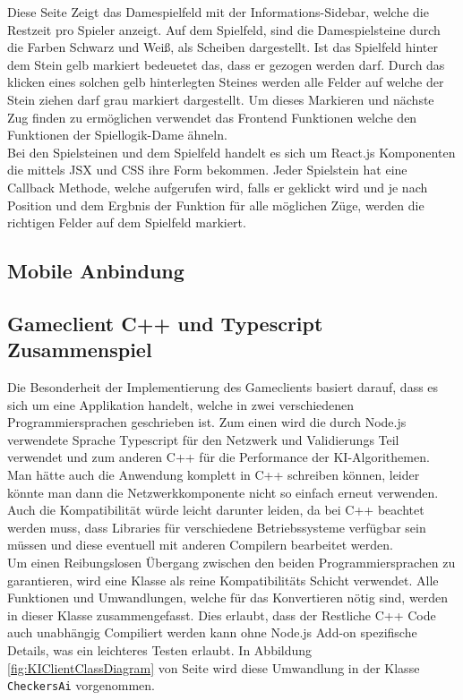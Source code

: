 \documentclass[12pt,a4paper,bibliography=totocnumbered,listof=totocnumbered]{article}
\begin{document}
Diese Seite Zeigt das Damespielfeld mit der Informations-Sidebar, welche die Restzeit pro Spieler anzeigt.
Auf dem Spielfeld, sind die Damespielsteine durch die Farben Schwarz und Weiß, als Scheiben dargestellt. 
Ist das Spielfeld hinter dem Stein gelb markiert bedeuetet das, dass er gezogen werden darf. 
Durch das klicken eines solchen gelb hinterlegten Steines werden alle Felder auf welche der Stein ziehen darf 
grau markiert dargestellt. Um dieses Markieren und nächste Zug finden zu ermöglichen verwendet das Frontend Funktionen 
welche den Funktionen der Spiellogik-Dame ähneln.
\\
Bei den Spielsteinen und dem Spielfeld handelt es sich um React.js Komponenten die mittels JSX und CSS ihre Form bekommen.
Jeder Spielstein hat eine Callback Methode, welche aufgerufen wird, falls er geklickt wird und je nach Position und 
dem Ergbnis der Funktion für alle möglichen Züge, werden die richtigen Felder auf dem Spielfeld markiert.

\subsection{Mobile Anbindung}

\subsection{Gameclient C++ und Typescript Zusammenspiel}
Die Besonderheit der Implementierung des Gameclients basiert darauf, dass es sich um eine Applikation handelt, welche in zwei verschiedenen 
Programmiersprachen geschrieben ist. Zum einen wird die durch Node.js verwendete Sprache Typescript für den Netzwerk und Validierungs Teil 
verwendet und zum anderen C++ für die Performance der KI-Algorithemen. Man hätte auch die Anwendung komplett in C++ schreiben können, leider 
könnte man dann die Netzwerkkomponente nicht so einfach erneut verwenden. Auch die Kompatibilität würde leicht darunter leiden, da 
bei C++ beachtet werden muss, dass Libraries für verschiedene Betriebssysteme verfügbar sein müssen und diese eventuell mit anderen 
Compilern bearbeitet werden. 
\\
Um einen Reibungslosen Übergang zwischen den beiden Programmiersprachen zu garantieren, wird eine Klasse als reine Kompatibilitäts Schicht verwendet.
Alle Funktionen und Umwandlungen, welche für das Konvertieren nötig sind, werden in dieser Klasse zusammengefasst. Dies erlaubt, dass der Restliche 
C++ Code auch unabhängig Compiliert werden kann ohne Node.js Add-on spezifische Details, was ein leichteres Testen erlaubt.
In Abbildung \ref{fig:KIClientClassDiagram} von Seite \pageref{fig:KIClientClassDiagram} wird diese Umwandlung in der Klasse \texttt{CheckersAi} 
vorgenommen.
\end{document}
